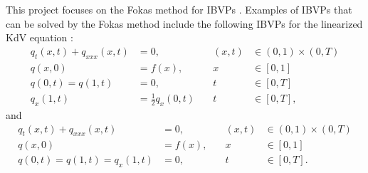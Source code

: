 \documentclass[12pt, oneside, a4paper]{article}
\begin{document}
This project focuses on the Fokas method for IBVPs \cite{Smith2016}. Examples of IBVPs that can be solved by the Fokas method include the following IBVPs for the linearized KdV equation \cite{Smith2016}:
\begin{subequations}\label{eq:problem_1}
    \begin{alignat}{3}
        q_t(x,t) + q_{xxx}(x,t) &= 0,\quad &(x,t)&\in (0,1)\times (0,T)\\
        q(x,0) &= f(x),\quad &x&\in [0,1]\\
        q(0,t) = q(1,t) &= 0, \quad &t&\in [0,T]\\
        q_x(1,t) &= \frac{1}{2}q_x(0,t)\quad &t&\in [0,T],
    \end{alignat}
\end{subequations}
and 
\begin{subequations}\label{eq:problem_2}
    \begin{alignat}{3}
        q_t(x,t) + q_{xxx}(x,t) &= 0,\quad &(x,t)&\in (0,1)\times (0,T)\\
        q(x,0) &= f(x),\quad &x&\in [0,1]\\
        q(0,t) = q(1,t) = q_x(1,t) &= 0, \quad &t&\in [0,T].
    \end{alignat}
\end{subequations}
\end{document}
